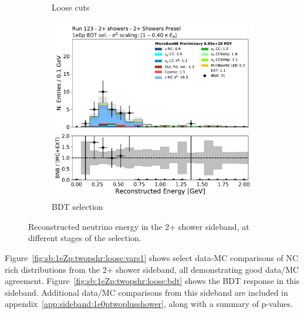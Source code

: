 \begin{figure}[H]
\begin{subfigure}{0.3\textwidth}
    \caption{\zpsel Loose cuts}
    \end{subfigure}
    \begin{subfigure}{0.3\textwidth}
    \includegraphics[width=1.00\textwidth]{Sidebands/Figures/TwoShr_1e0pSel_newSamples/reco_e_BDT.pdf}
    \caption{\zpsel BDT selection}
    \end{subfigure}
    \caption{\label{fig:sb:1eZp:twopshr:recoe} Reconstructed neutrino energy in the 2+ shower sideband, at different stages of the \zpsel selection.}
\end{figure}

Figure~\ref{fig:sb:1eZp:twopshr:loose:vars1} shows select data-MC comparisons of NC \pizero rich distributions from the 2+ shower \zpsel sideband, all demonstrating good data/MC agreement. Figure~\ref{fig:sb:1eZp:twopshr:loose:bdt} shows the BDT response in this sideband. Additional data/MC comparisons from this sideband are included in appendix~\ref{app:sideband:1e0ptwoplusshower}, along with a summary of p-values.

